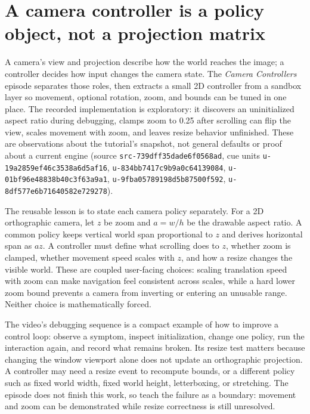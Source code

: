 \section{A camera controller is a policy object, not a projection matrix}\label{06-engine-ii-ch046-a-camera-controller-is-a-policy-object-not-a-projection-matrix}

A camera's view and projection describe how the world reaches the image; a controller decides how input changes the camera state. The \emph{Camera Controllers} episode separates those roles, then extracts a small 2D controller from a sandbox layer so movement, optional rotation, zoom, and bounds can be tuned in one place. The recorded implementation is exploratory: it discovers an uninitialized aspect ratio during debugging, clamps zoom to 0.25 after scrolling can flip the view, scales movement with zoom, and leaves resize behavior unfinished. These are observations about the tutorial's snapshot, not general defaults or proof about a current engine (source \texttt{src-739dff35dade6f0568ad}, cue units \texttt{u-19a2859ef46c3538a6d5af16}, \texttt{u-834bb7417c9b9a0c64139084}, \texttt{u-01bf96e48838b40c3f63a9a1}, \texttt{u-9fba05789198d5b87500f592}, \texttt{u-8df577e6b71640582e729278}).

The reusable lesson is to state each camera policy separately. For a 2D orthographic camera, let \(z\) be zoom and \(a=w/h\) be the drawable aspect ratio. A common policy keeps vertical world span proportional to \(z\) and derives horizontal span as \(az\). A controller must define what scrolling does to \(z\), whether zoom is clamped, whether movement speed scales with \(z\), and how a resize changes the visible world. These are coupled user-facing choices: scaling translation speed with zoom can make navigation feel consistent across scales, while a hard lower zoom bound prevents a camera from inverting or entering an unusable range. Neither choice is mathematically forced.

The video's debugging sequence is a compact example of how to improve a control loop: observe a symptom, inspect initialization, change one policy, run the interaction again, and record what remains broken. Its resize test matters because changing the window viewport alone does not update an orthographic projection. A controller may need a resize event to recompute bounds, or a different policy such as fixed world width, fixed world height, letterboxing, or stretching. The episode does not finish this work, so teach the failure as a boundary: movement and zoom can be demonstrated while resize correctness is still unresolved.

